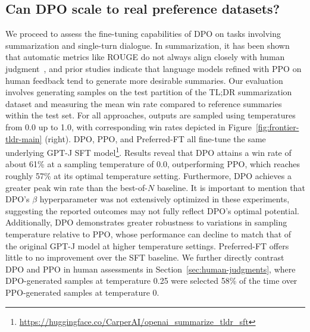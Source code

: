 \subsection{Can DPO scale to real preference datasets?}
\label{sec:dpo-real-datasets}
We proceed to assess the fine-tuning capabilities of DPO on tasks involving summarization and single-turn dialogue. In summarization, it has been shown that automatic metrics like ROUGE do not always align closely with human judgment~\citep{stiennon2022learning}, and prior studies indicate that language models refined with PPO on human feedback tend to generate more desirable summaries. Our evaluation involves generating samples on the test partition of the TL;DR summarization dataset and measuring the mean win rate compared to reference summaries within the test set. For all approaches, outputs are sampled using temperatures from 0.0 up to 1.0, with corresponding win rates depicted in Figure~\ref{fig:frontier-tldr-main} (right). DPO, PPO, and Preferred-FT all fine-tune the same underlying GPT-J SFT model\footnote{\url{https://huggingface.co/CarperAI/openai_summarize_tldr_sft}}. Results reveal that DPO attains a win rate of about 61\% at a sampling temperature of 0.0, outperforming PPO, which reaches roughly 57\% at its optimal temperature setting. Furthermore, DPO achieves a greater peak win rate than the best-of-$N$ baseline. It is important to mention that DPO’s $\beta$ hyperparameter was not extensively optimized in these experiments, suggesting the reported outcomes may not fully reflect DPO’s optimal potential. Additionally, DPO demonstrates greater robustness to variations in sampling temperature relative to PPO, whose performance can decline to match that of the original GPT-J model at higher temperature settings. Preferred-FT offers little to no improvement over the SFT baseline. We further directly contrast DPO and PPO in human assessments in Section~\ref{sec:human-judgments}, where DPO-generated samples at temperature 0.25 were selected 58\% of the time over PPO-generated samples at temperature 0.

